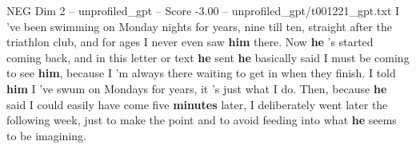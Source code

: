 \begin{textsample}{NEG Dim 2 – unprofiled\_gpt – Score -3.00 – unprofiled\_gpt/t001221\_gpt.txt}  \label{ex:f2_neg_023}
I ’ve been swimming on Monday nights for years, nine till ten, straight after the triathlon club, and for ages I never even saw \textbf{him} there.
Now \textbf{he} ’s started coming back, and in this letter or text \textbf{he} sent \textbf{he} basically said I must be coming to see \textbf{him}, because I ’m always there waiting to get in when they finish.
I told \textbf{him} I ’ve swum on Mondays for years, it ’s just what I do.
Then, because \textbf{he} said I could easily have come five \textbf{minutes} later, I deliberately went later the following week, just to make the point and to avoid feeding into what \textbf{he} seems to be imagining.

\end{textsample}
